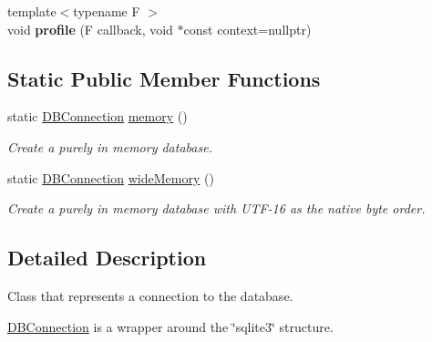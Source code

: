 \begin{DoxyCompactItemize}
\item 
\hypertarget{class_s_q_lite_1_1_d_b_connection_a706db2c2ee83a99fb8c9fbbbc76b8cfc}{{\footnotesize template$<$typename F $>$ }\\void {\bfseries profile} (F callback, void $\ast$const context=nullptr)}\label{class_s_q_lite_1_1_d_b_connection_a706db2c2ee83a99fb8c9fbbbc76b8cfc}

\end{DoxyCompactItemize}
\subsection*{Static Public Member Functions}
\begin{DoxyCompactItemize}
\item 
static \hyperlink{class_s_q_lite_1_1_d_b_connection}{D\-B\-Connection} \hyperlink{class_s_q_lite_1_1_d_b_connection_a5bd49a76155ffede0dca70f54c794159}{memory} ()
\begin{DoxyCompactList}\small\item\em Create a purely in memory database. \end{DoxyCompactList}\item 
static \hyperlink{class_s_q_lite_1_1_d_b_connection}{D\-B\-Connection} \hyperlink{class_s_q_lite_1_1_d_b_connection_a40beb5c2c30cd861a8b7c743b5e8881e}{wide\-Memory} ()
\begin{DoxyCompactList}\small\item\em Create a purely in memory database with U\-T\-F-\/16 as the native byte order. \end{DoxyCompactList}\end{DoxyCompactItemize}


\subsection{Detailed Description}
Class that represents a connection to the database. 

\hyperlink{class_s_q_lite_1_1_d_b_connection}{D\-B\-Connection} is a wrapper around the \char`\"{}sqlite3\char`\"{} structure. 

